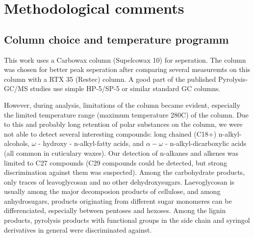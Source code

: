 % 
% 
% 
% 



\chapter{Methodological comments}

\section{Column choice and temperature programm}
This work uses a Carbowax column (Supelcowax 10) for seperation. The column was chosen for better peak seperation after comparing several measuremts on this column with a RTX 35 (Restec) column. A good part of the published Pyrolysis-GC/MS studies use simple HP-5/SP-5 or similar standard GC columns.

However, during analysis, limitations of the column became evident, especially the limited temperature range (maximum temperature 280\textdegree C) of the column. Due to this and probably long retention of polar substances on the column, we were not able to detect several interesting compounds: long chained (C18+) n-alkyl-alcohols, $\omega$ - hydroxy - n-alkyl-fatty acids, and $\alpha - \omega$ - n-alkyl-dicarboxylic acids (all common in cuticulary waxes). Our detection of n-alkanes and alkenes was limited to C27 compounds (C29 compounds could be detected, but strong discrimination against them was suspected). Among the carbohydrate products, only traces of leavoglycosan and no other dehydroxysugars. Laevoglycosan is usually among the major decomposion products of cellulose, and among anhydrosugars, products originating from different sugar monomeres can be differenciated, especially between pentoses and hexoses. 
Among the lignin products, pyrolysis products with functional groups in the side chain and syringol derivatives in general were discriminated against. 


